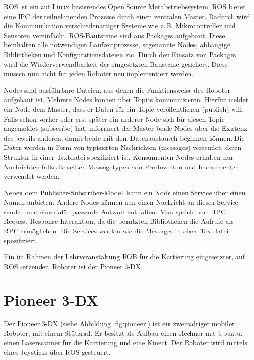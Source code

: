 \ac{ROS} ist ein auf Linux basierendes Open Source Metabetriebssystem. \ac{ROS} bietet eine \ac{IPC} der teilnehmenden Prozesse durch einen zentralen Master. Dadurch wird die Kommunikation verschiedenartiger Systeme wie z.\,B. Mikrocontroller und Sensoren vereinfacht. \ac{ROS}-Bautsteine sind aus Packages aufgebaut. Diese beinhalten alle notwendigen Laufzeitprozesse, sogenannte Nodes, abhängige Bibliotheken und Konfigurationsdateien etc. Durch den Einsatz von Packages wird die Wiederverwendbarkeit der eingesetzten Bausteine gesichert. Diese müssen nun nicht für jeden Roboter neu implementiert werden.\par
Nodes sind ausführbare Dateien, aus denen die Funktionsweise des Roboter aufgebaut ist. Mehrere Nodes können über Topics kommunizieren. Hierfür meldet ein Node dem Master, dass er Daten für ein Topic veröffentlichen (publish) will. Falls schon vorher oder erst später ein anderer Node sich für diesen Topic angemeldet (subscribe) hat, informiert der Master beide Nodes über die Existenz des jeweils anderen, damit beide mit dem Datenaustausch beginnen können. Die Daten werden in Form von typisierten Nachrichten (messages) versendet, deren Struktur in einer Textdatei spezifiziert ist. Konsumenten-Nodes erhalten nur Nachrichten falls die selben Messagetypen von Produzenten und Konsumenten verwendet werden.\par
Neben dem Publisher-Subscriber-Modell kann ein Node einen Service über einen Namen anbieten. Andere Nodes können nun einen Nachricht an diesen Service senden und eine dafür passende Antwort enthalten. Man spricht von \ac{RPC} Request-Response-Interaktion, da die benutzten Bibliotheken die Aufrufe als \ac{RPC} ermöglichen. Die Services werden wie die Messages in einer Textdatei spezifiziert.\par
Ein im Rahmen der Lehrveranstaltung \ac{ROB} für die Kartierung einge\-se\-tzt\-er, auf \ac{ROS} setzender, Roboter ist der Pioneer 3-DX.


\section{Pioneer 3-DX} %
\label{sec:pioneer}

Der Pioneer 3-DX (siehe Abbildung \ref{fig:pioneer}) ist ein zweirädriger mobiler Roboter, mit einem Stützrad. Er besitzt als Aufbau einen Rechner mit Ubuntu, einen Laserscanner für die Kartierung und eine Kinect. Der Roboter wird mittels eines Joysticks über \ac{ROS} gesteuert.


